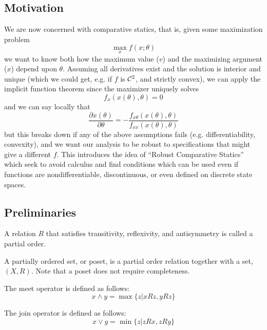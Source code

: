 

\subsection{Motivation}
\label{sec:motivation}

We are now concerned with comparative statics, that is, given some
maximization problem
\[
\max_{x} f(x; \theta)
\]
we want to know both how the maximum value ($v$) and the maximizing
argument ($x$) depend upon $\theta$. Assuming all derivatives exist
and the solution is interior and unique (which we could get, e.g. if
$f$ is ${\cal C}^2$, and strictly convex), we can apply the implicit
function theorem since the maximizer uniquely solves
\[
f_x(x(\theta), \theta) = 0
\]
and we can say locally that
\[
\frac{\partial x(\theta)}{\partial \theta}
= - \frac{f_{x\theta}(x(\theta), \theta)}{f_{xx}(x(\theta),\theta)}
\]
but this breaks down if any of the above assumptions fails
(e.g. differentiability, convexity), and we want our analysis to be
robust to specifications that might give a different $f$. This
introduces the idea of ``Robust Comparative Statics'' which seek to
avoid calculus and find conditions which can be used even if functions
are nondifferentiable, discontinuous, or even defined on discrete
state spaces.


\subsection{Preliminaries}
\label{sec:preliminaries}

\begin{definition}
  A relation $R$ that satisfies transitivity, reflexivity, and
  antisymmetry is called a partial order.
\end{definition}

\begin{definition}
  A partially ordered set, or poset, is a partial order relation
  together with a set, $(X, R)$. Note that a poset does not require
  completeness.
\end{definition}

\begin{definition}[Meet]
  The meet operator is defined as follows:
  \[
  x \wedge y = \max\{z | xRz, yRz\}
  \]
\end{definition}

\begin{definition}[Join]
  The join operator is defined as follows:
  \[
  x \vee y = \min\{z | zRx, zRy\}
  \]
\end{definition}

